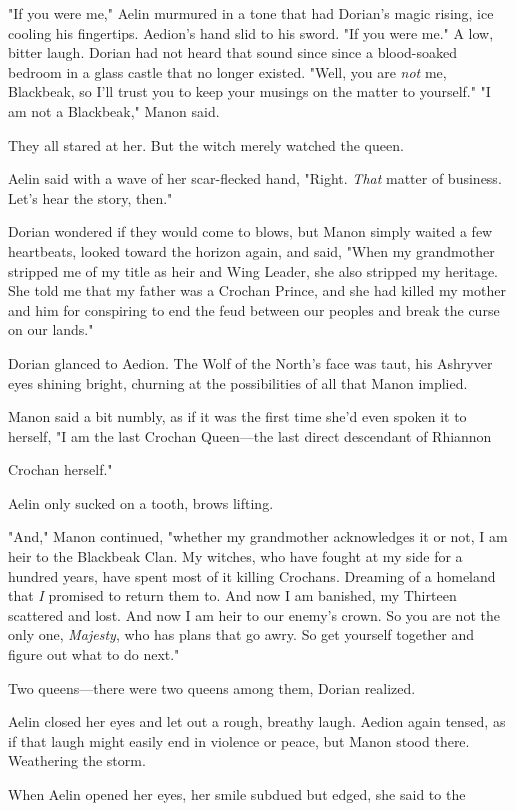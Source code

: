 "If you were me," Aelin murmured in a tone that had Dorian's magic rising, ice cooling his fingertips. Aedion's hand slid to his sword. "If you were me." A low, bitter laugh. Dorian had not heard that sound since  since a blood-soaked bedroom in a glass castle that no longer existed. "Well, you are \emph{not} me, Blackbeak, so I'll trust you to keep your musings on the matter to yourself." "I am not a Blackbeak," Manon said.

They all stared at her. But the witch merely watched the queen.

Aelin said with a wave of her scar-flecked hand, "Right. \emph{That}
matter of business. Let's hear the story, then."

Dorian wondered if they would come to blows, but Manon simply waited a few heartbeats, looked toward the horizon again, and said, "When my grandmother stripped me of my title as heir and Wing Leader, she also stripped my heritage. She told me that my father was a Crochan Prince, and she had killed my mother and him for conspiring to end the feud between our peoples and break the curse on our lands."

Dorian glanced to Aedion. The Wolf of the North's face was taut, his Ashryver eyes shining bright, churning at the possibilities of all that Manon implied.

Manon said a bit numbly, as if it was the first time she'd even spoken it to herself, "I am the last Crochan Queen---the last direct descendant of Rhiannon

Crochan herself."

Aelin only sucked on a tooth, brows lifting.

"And," Manon continued, "whether my grandmother acknowledges it or not, I am heir to the Blackbeak Clan. My witches, who have fought at my side for a hundred years, have spent most of it killing Crochans. Dreaming of a homeland that \emph{I} promised to return them to. And now I am banished, my Thirteen scattered and lost. And now I am heir to our enemy's crown. So you are not the only one, \emph{Majesty}, who has plans that go awry. So get yourself together and figure out what to do next."

Two queens---there were two queens among them, Dorian realized.

Aelin closed her eyes and let out a rough, breathy laugh. Aedion again tensed, as if that laugh might easily end in violence or peace, but Manon stood there. Weathering the storm.

When Aelin opened her eyes, her smile subdued but edged, she said to the

